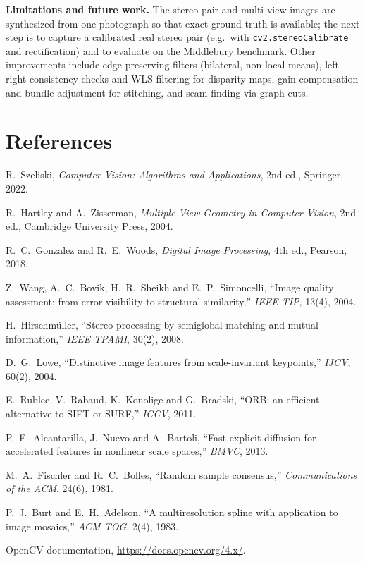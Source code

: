 \documentclass[a4paper,12pt]{article}
\begin{document}
\textbf{Limitations and future work.} The stereo pair and multi-view images are synthesized
from one photograph so that exact ground truth is available; the next step is to capture a
calibrated real stereo pair (e.g.\ with \texttt{cv2.stereoCalibrate} and rectification) and to
evaluate on the Middlebury benchmark. Other improvements include edge-preserving filters (bilateral,
non-local means), left-right consistency checks and WLS filtering for disparity maps, gain
compensation and bundle adjustment for stitching, and seam finding via graph cuts.

\section*{References}
\begin{enumerate}[label={[\arabic*]}, leftmargin=*]
    \item R.~Szeliski, \emph{Computer Vision: Algorithms and Applications}, 2nd ed., Springer, 2022.
    \item R.~Hartley and A.~Zisserman, \emph{Multiple View Geometry in Computer Vision}, 2nd ed., Cambridge University Press, 2004.
    \item R.~C.~Gonzalez and R.~E.~Woods, \emph{Digital Image Processing}, 4th ed., Pearson, 2018.
    \item Z.~Wang, A.~C.~Bovik, H.~R.~Sheikh and E.~P.~Simoncelli, ``Image quality assessment: from error visibility to structural similarity,'' \emph{IEEE TIP}, 13(4), 2004.
    \item H.~Hirschm\"uller, ``Stereo processing by semiglobal matching and mutual information,'' \emph{IEEE TPAMI}, 30(2), 2008.
    \item D.~G.~Lowe, ``Distinctive image features from scale-invariant keypoints,'' \emph{IJCV}, 60(2), 2004.
    \item E.~Rublee, V.~Rabaud, K.~Konolige and G.~Bradski, ``ORB: an efficient alternative to SIFT or SURF,'' \emph{ICCV}, 2011.
    \item P.~F.~Alcantarilla, J.~Nuevo and A.~Bartoli, ``Fast explicit diffusion for accelerated features in nonlinear scale spaces,'' \emph{BMVC}, 2013.
    \item M.~A.~Fischler and R.~C.~Bolles, ``Random sample consensus,'' \emph{Communications of the ACM}, 24(6), 1981.
    \item P.~J.~Burt and E.~H.~Adelson, ``A multiresolution spline with application to image mosaics,'' \emph{ACM TOG}, 2(4), 1983.
    \item OpenCV documentation, \url{https://docs.opencv.org/4.x/}.
\end{enumerate}
\end{document}
